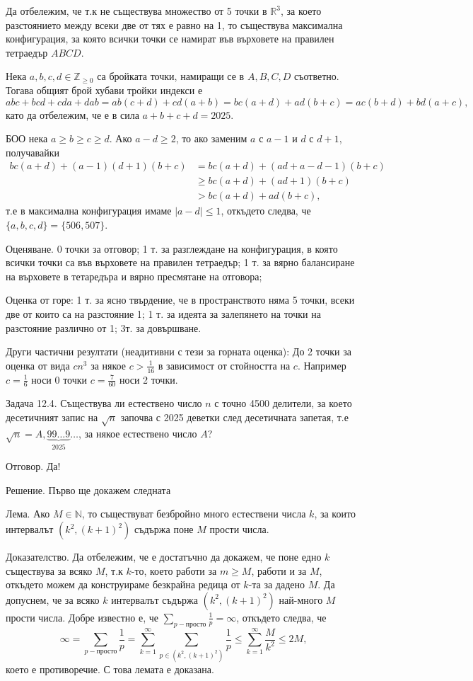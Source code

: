 Да отбележим, че т.к не съществува множество от 5 точки в $\mathbb R^3$, за което разстоянието между всеки две от тях е равно на 1, то съществува максимална конфигурация, за която всички точки се намират във върховете на правилен тетраедър $ABCD$.

Нека $a,b,c,d\in\mathbb Z_{\ge0}$ са бройката точки, намиращи се в $A,B,C,D$ съответно. Тогава общият брой хубави тройки индекси е
$$abc+bcd+cda+dab=ab(c+d)+cd(a+b)=bc(a+d)+ad(b+c)=ac(b+d)+bd(a+c),$$
като да отбележим, че е в сила $a+b+c+d=2025$.

БОО нека $a\ge b\ge c\ge d$. Ако $a-d\ge2$, то ако заменим $a$ с $a-1$ и $d$ с $d+1$, получавайки
$$\begin{aligned}
bc(a+d)+(a-1)(d+1)(b+c)&=bc(a+d)+(ad+a-d-1)(b+c)\\
&\ge bc(a+d)+(ad+1)(b+c)\\
&>bc(a+d)+ad(b+c),
\end{aligned}$$
т.е в максимална конфигурация имаме $|a-d|\le1$, откъдето следва, че $\{a,b,c,d\}=\{506,507\}$.

Оценяване. 0 точки за отговор; 1 т. за разглеждане на конфигурация, в която всички точки са във върховете на правилен тетраедър; 1 т. за вярно балансиране на върховете в тетаредъра и вярно пресмятане на отговора;

Оценка от горе: 1 т. за ясно твърдение, че в пространството няма 5 точки, всеки две от които са на разстояние 1; 1 т. за идеята за залепянето на точки на разстояние различно от 1; 3т. за довършване.

Други частични резултати (неадитивни с тези за горната оценка): До 2 точки за оценка от вида $cn^3$ за някое $c>\frac1{16}$ в зависимост от стойността на $c$. Например $c=\frac16$ носи 0 точки $c=\frac7{60}$ носи 2 точки.

Задача 12.4. Съществува ли естествено число $n$ с точно 4500 делители, за което десетичният запис на $\sqrt n$ започва с 2025 деветки след десетичната запетая, т.е $\sqrt n=A,\underbrace{99\ldots9}_{2025}\ldots$, за някое естествено число $A$?

Отговор. Да!

Решение. Първо ще докажем следната

Лема. Ако $M\in\mathbb N$, то съществуват безбройно много естествени числа $k$, за които интервалът $(k^2,(k+1)^2)$ съдържа поне $M$ прости числа.

Доказателство. Да отбележим, че е достатъчно да докажем, че поне едно $k$ съществува за всяко $M$, т.к $k$-то, което работи за $m\ge M$, работи и за $M$, откъдето можем да конструираме безкрайна редица от $k$-та за дадено $M$. Да допуснем, че за всяко $k$ интервалът съдържа $(k^2,(k+1)^2)$ най-много $M$ прости числа. Добре известно е, че $\sum_{p-\text{просто}}\frac1p=\infty$, откъдето следва, че
$$\infty=\sum_{p-\text{просто}}\frac1p=\sum_{k=1}^{\infty}\sum_{p\in(k^2,(k+1)^2)}\frac1p\le\sum_{k=1}^{\infty}\frac{M}{k^2}\le2M,$$
което е противоречие. С това лемата е доказана.

